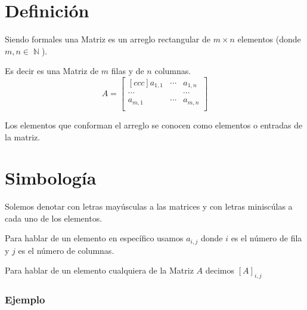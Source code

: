 \documentclass[12pt]{report}                                    %
\DeclareMathOperator \Naturals  {\mathbb{N}}                     %
\begin{document}
        \clearpage
        \section{Definición}

            Siendo formales una Matriz es un arreglo rectangular de $m \times n$ elementos 
            (donde $m,n \in \Naturals$).

            Es decir es una Matriz de $m$ filas y de $n$ columnas.
            \begin{equation}
                A = 
                \begin{bmatrix}[ccc]
                    a _{1, 1}   & \cdots & a_{1,n}   \\
                    \cdots      &        & \cdots    \\
                    a _{m, 1}   & \cdots & a_{m,n}   \\
                \end{bmatrix}
            \end{equation}

            Los elementos que conforman el arreglo se conocen como elementos o entradas
            de la matriz.




        \section{Simbología}

            Solemos denotar con letras mayúsculas a las matrices y con letras miniscúlas
            a cada uno de los elementos.

            Para hablar de un elemento en específico usamos $a_{i,j}$ donde $i$ es el
            número de fila y $j$ es el número de columnas.

            Para hablar de un elemento cualquiera de la Matriz $A$ decimos $[A]_{i,j}$

            \subsubsection*{Ejemplo}
\end{document}

